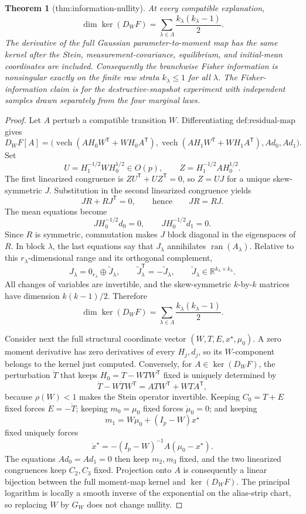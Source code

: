 \documentclass{article}
\newtheorem{theorem}{Theorem}
\begin{document}
\begin{theorem}[thm:information-nullity]\label{thm:information-nullity}
At every compatible explanation, \[\dim\ker(D_WF)=\sum_{\lambda\in\Lambda}\frac{k_\lambda(k_\lambda-1)}{2}.\] The derivative of the full Gaussian parameter-to-moment map has the same kernel after the Stein, measurement-covariance, equilibrium, and initial-mean coordinates are included. Consequently the branchwise Fisher information is nonsingular exactly on the finite raw strata \(k_\lambda\le1\) for all \(\lambda\). The Fisher-information claim is for the destructive-snapshot experiment with independent samples drawn separately from the four marginal laws.
\end{theorem}
\begin{proof}
Let \(A\) perturb a compatible transition \(W\).  Differentiating \(\text{def:residual-map}\) gives
\[
 D_WF[A]=\bigl(
 \operatorname{vech}(AH_0W^{\mathsf T}+WH_0A^{\mathsf T}),
 \operatorname{vech}(AH_1W^{\mathsf T}+WH_1A^{\mathsf T}),
 Ad_0,Ad_1\bigr).
\]
Set
\[
 U=H_1^{-1/2}WH_0^{1/2}\in O(p),\qquad
 Z=H_1^{-1/2}AH_0^{1/2}.
\]
The first linearized congruence is \(ZU^{\mathsf T}+UZ^{\mathsf T}=0\), so \(Z=UJ\) for a unique skew-symmetric \(J\).  Substitution in the second linearized congruence yields
\[
 JR+RJ^{\mathsf T}=0,\qquad\text{hence}\qquad JR=RJ.
\]
The mean equations become
\[
 JH_0^{-1/2}d_0=0,\qquad JH_0^{-1/2}d_1=0.
\]
Since \(R\) is symmetric, commutation makes \(J\) block diagonal in the eigenspaces of \(R\).  In block \(\lambda\), the last equations say that \(J_\lambda\) annihilates \(\operatorname{ran}(A_\lambda)\).  Relative to this \(r_\lambda\)-dimensional range and its orthogonal complement,
\[
 J_\lambda=0_{r_\lambda}\oplus\widetilde J_\lambda,\qquad
 \widetilde J_\lambda^{\mathsf T}=-\widetilde J_\lambda,\qquad
 \widetilde J_\lambda\in\mathbb R^{k_\lambda\times k_\lambda}.
\]
All changes of variables are invertible, and the skew-symmetric \(k\)-by-\(k\) matrices have dimension \(k(k-1)/2\).  Therefore
\[
 \dim\ker(D_WF)=\sum_{\lambda\in\Lambda}
 \frac{k_\lambda(k_\lambda-1)}2.
\]

Consider next the full structural coordinate vector \((W,T,E,x^\star,\mu_0)\).  A zero moment derivative has zero derivatives of every \(H_j,d_j\), so its \(W\)-component belongs to the kernel just computed.  Conversely, for \(A\in\ker(D_WF)\), the perturbation \(\dot T\) that keeps \(H_0=T-WTW^{\mathsf T}\) fixed is uniquely determined by
\[
 \dot T-W\dot TW^{\mathsf T}=ATW^{\mathsf T}+WTA^{\mathsf T},
\]
because \(\rho(W)<1\) makes the Stein operator invertible.  Keeping \(C_0=T+E\) fixed forces \(\dot E=-\dot T\); keeping \(m_0=\mu_0\) fixed forces \(\dot\mu_0=0\); and keeping
\[
 m_1=W\mu_0+(I_p-W)x^\star
\]
fixed uniquely forces
\[
 \dot x^\star=-(I_p-W)^{-1}A(\mu_0-x^\star).
\]
The equations \(Ad_0=Ad_1=0\) then keep \(m_2,m_3\) fixed, and the two linearized congruences keep \(C_2,C_3\) fixed.  Projection onto \(A\) is consequently a linear bijection between the full moment-map kernel and \(\ker(D_WF)\).  The principal logarithm is locally a smooth inverse of the exponential on the alias-strip chart, so replacing \(W\) by \(G_W\) does not change nullity.


\end{proof}
\end{document}
